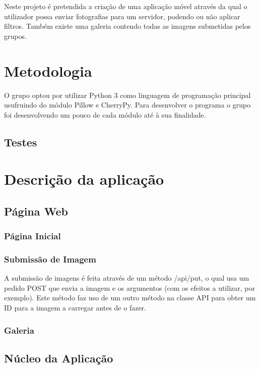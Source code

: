 \documentclass{report}
\begin{document}
Neste projeto é pretendida a criação de uma aplicação móvel através da qual o utilizador possa enviar fotografias para um servidor, podendo ou não aplicar filtros. Também existe uma galeria contendo todas as imagens submetidas pelos grupos.

\chapter{Metodologia}
\label{chap.metodologia}

O grupo optou por utilizar Python 3 como linguagem de programação principal usufruindo do módulo Pillow e CherryPy. Para desenvolver o programa o grupo foi desenvolvendo um pouco de cada módulo até à sua finalidade.

\section{Testes}


\chapter{Descrição da aplicação}
\label{chap.desc}

\section{Página Web}


\subsection{Página Inicial}


\subsection{Submissão de Imagem}

A submissão de imagens é feita através de um método /api/put, o qual usa um pedido POST que envia a imagem e os argumentos (com os efeitos a utilizar, por exemplo). Este método faz uso de um outro método na classe API para obter um ID para a imagem a carregar antes de o fazer.

\subsection{Galeria}

\section{Núcleo da Aplicação}
\end{document}
